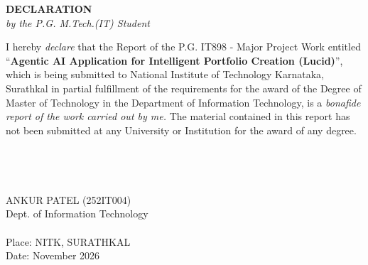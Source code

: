 \documentclass[12pt, a4paper, openright, twoside]{report}
\begin{document}
\begin{framed}
\begin{center}
\textbf{{\Large DECLARATION}}\\
\textit{by the P.G. M.Tech.(IT) Student}\\
\end{center}
\null
I hereby \textit{declare} that the Report of the P.G. IT898 - Major Project Work entitled ``\textbf{Agentic AI Application for Intelligent Portfolio Creation (Lucid)}'', which is being submitted to National Institute of Technology Karnataka, Surathkal in partial fulfillment of the requirements for the award of the Degree of Master of Technology in the Department of Information Technology, is a \textit{bonafide report of the work carried out by me.} The material contained in this report has not been submitted at any University or Institution for the award of any degree.\\
\\
\\
\\
\\
\null \hfill ANKUR PATEL (252IT004)\\
\null \hfill Dept. of Information Technology\\
\\
Place: NITK, SURATHKAL
\\
Date: November 2026
\end{framed}
\clearpage
\newpage

\ %

\newpage
\end{document}
